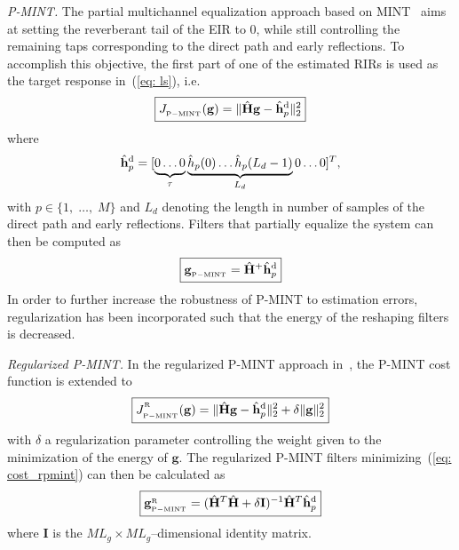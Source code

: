 \documentclass{article}
\begin{document}
\smallskip \noindent \textit{P-MINT.} \enspace
The partial multichannel equalization approach based on MINT~\cite{Kodrasi_ICASSP_2012} aims at setting the reverberant tail of the EIR to $0$, while still controlling the remaining taps corresponding to the direct path and early reflections. 
To accomplish this objective, the first part of one of the estimated RIRs is used as the target response in~(\ref{eq: ls}), i.e.  
\begin{equation}
\boxed{J_{{}_{\rm P-MINT}}(\mathbf{g}) = \|{\hat{\mathbf{H}}}\mathbf{g} - {\hat{\mathbf{h}}}_p^{\rm d}\|_2^2}
\end{equation}
where
\begin{equation}
\hat{\mathbf{h}}_{p}^{\rm d} = [\underbrace{0\phantom{\rlap{$(L_d-1)$}} \ldots 0 }_{\tau} \underbrace{\hat{h}_p(0) \ldots \hat{h}_p(L_d-1)}_{L_d} 0 \ldots 0 ]^{T},
\end{equation}
with $p \in \{1, \; \ldots, \; M\}$ and $L_d$ denoting the length in number of samples of the direct path and early reflections.
Filters that partially equalize the system can then be computed as
\begin{equation}  
\label{eq: pmintsol}  
\boxed{\mathbf{g}_{{}_{\rm P-MINT}} = {\hat{\mathbf{H}}}^{+}{\hat{\mathbf{h}}}_p^{\rm d}}
\end{equation}  
In order to further increase the robustness of P-MINT to estimation errors, regularization has been incorporated such that the energy of the reshaping filters is decreased.

\smallskip \noindent \textit{Regularized P-MINT.} \enspace In the regularized P-MINT approach in~\cite{Kodrasi_ICASSP_2012}, the P-MINT cost function is extended to
\begin{equation}
\label{eq: cost_rpmint}
\boxed{J_{{}_{\rm P-MINT}}^{^{_{\rm R}}}(\mathbf{g}) = \|\hat{\mathbf{H}}\mathbf{g} - \hat{\mathbf{h}}_p^{\rm d}\|_2^2 + \delta \|\mathbf{g} \|_2^2}
\end{equation}
with $\delta$ a regularization parameter controlling the weight given to the minimization of the energy of $\mathbf{g}$.
The regularized P-MINT filters minimizing~(\ref{eq: cost_rpmint}) can then be calculated as
\begin{equation}
\label{eq: rpmintsol}
\boxed{\mathbf{g}_{{}_{\rm P-MINT}}^{_{\rm R}}  = (\hat{\mathbf{H}}^T\hat{\mathbf{H}}+\delta \mathbf{I})^{-1}\hat{\mathbf{H}}^{T}\hat{\mathbf{h}}_p^{\rm d}}
\end{equation}
where $\mathbf{I}$ is the $ML_g \times ML_g$--dimensional identity matrix.
\end{document}
